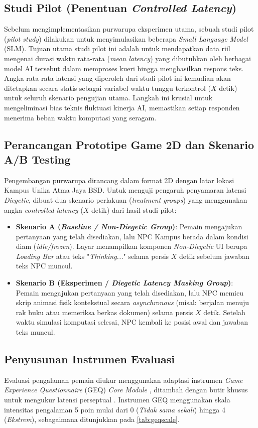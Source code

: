 \subsection{Studi Pilot (Penentuan \textit{Controlled Latency})}
Sebelum mengimplementasikan purwarupa eksperimen utama, sebuah studi pilot (\textit{pilot study}) dilakukan untuk menyimulasikan beberapa \textit{Small Language Model} (SLM). Tujuan utama studi pilot ini adalah untuk mendapatkan data riil mengenai durasi waktu rata-rata (\textit{mean latency}) yang dibutuhkan oleh berbagai model AI tersebut dalam memproses kueri hingga menghasilkan respons teks. Angka rata-rata latensi yang diperoleh dari studi pilot ini kemudian akan ditetapkan secara statis sebagai variabel waktu tunggu terkontrol ($X$ detik) untuk seluruh skenario pengujian utama. Langkah ini krusial untuk mengeliminasi bias teknis fluktuasi kinerja AI, memastikan setiap responden menerima beban waktu komputasi yang seragam.

\subsection{Perancangan Prototipe Game 2D dan Skenario A/B Testing}
Pengembangan purwarupa dirancang dalam format 2D dengan latar lokasi Kampus Unika Atma Jaya BSD. Untuk menguji pengaruh penyamaran latensi \textit{Diegetic}, dibuat dua skenario perlakuan (\textit{treatment groups}) yang menggunakan angka \textit{controlled latency} ($X$ detik) dari hasil studi pilot:
\begin{itemize}
    \item \textbf{Skenario A (\textit{Baseline / Non-Diegetic Group})}: Pemain mengajukan pertanyaan yang telah disediakan, lalu NPC Kampus berada dalam kondisi diam (\textit{idle/frozen}). Layar menampilkan komponen \textit{Non-Diegetic} UI berupa \textit{Loading Bar} atau teks "\textit{Thinking...}" selama persis $X$ detik sebelum jawaban teks NPC muncul.
    \item \textbf{Skenario B (Eksperimen / \textit{Diegetic Latency Masking Group})}: Pemain mengajukan pertanyaan yang telah disediakan, lalu NPC memicu skrip animasi fisik kontekstual secara \textit{asynchronous} (misal: berjalan menuju rak buku atau memeriksa berkas dokumen) selama persis $X$ detik. Setelah waktu simulasi komputasi selesai, NPC kembali ke posisi awal dan jawaban teks muncul.
\end{itemize}

\subsection{Penyusunan Instrumen Evaluasi}
Evaluasi pengalaman pemain diukur menggunakan adaptasi instrumen \textit{Game Experience Questionnaire} (GEQ) \textit{Core Module} \citep{ijsselsteijn2013game}, ditambah dengan butir khusus untuk mengukur latensi perseptual \citep{elfleet2024investigating}. Instrumen GEQ menggunakan skala intensitas pengalaman 5 poin mulai dari 0 (\textit{Tidak sama sekali}) hingga 4 (\textit{Ekstrem}), sebagaimana ditunjukkan pada \cref{tab:geqscale}.

